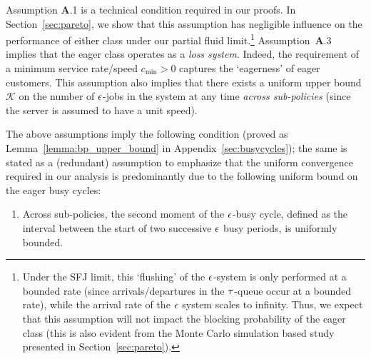 Assumption {\bf A}.1 is a technical condition required in our proofs.
In Section~\ref{sec:pareto}, we show that this assumption has
negligible influence on the performance of either class under our
partial fluid limit.\footnote{ Under the SFJ limit, this `flushing' of
  the ${ \epsilon }$-system is only performed at a bounded rate (since
  arrivals/departures in the ${\tau}$-queue occur at a bounded rate),
  while the arrival rate of the ${ \epsilon }$ system scales to infinity. Thus,
  we expect that this assumption will not impact the blocking
  probability of the eager class (this is also evident from the Monte
  Carlo simulation based study presented in
  Section~\ref{sec:pareto}).} 
% 
Assumption~{\bf A}.3 implies that the eager class operates as a
\emph{loss system}. Indeed, the requirement of a minimum service
rate/speed $c_{\min} > 0$ captures the `eagerness' of eager
customers. This assumption also implies that there exists a uniform
upper bound $\mathcal{K}$ on the number of ${ \epsilon }$-jobs in the system at
any time \emph{across sub-policies} (since the server is assumed to
have a unit speed).

The above assumptions imply the following condition (proved as
Lemma~\ref{lemma:bp_upper_bound} in Appendix~\ref{sec:busycycles});
the same is stated as a (redundant) assumption to emphasize that the
uniform convergence required in our analysis is predominantly due to
the following uniform bound on the eager busy cycles:
\begin{enumerate}[{\bf A}.4]
\item Across sub-policies, the second moment of the ${ \epsilon }$-busy cycle,
  defined as the interval between the start of two successive ${ \epsilon }$
  busy periods, is uniformly bounded.
\end{enumerate}
%

%


